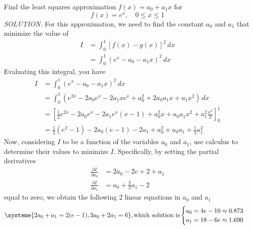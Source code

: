 \documentclass{article}
\newcommand\ddfrac[2]{\frac{\displaystyle #1}{\displaystyle #2}}
\begin{document}
    Find the least squares approximation $f(x) = a_0 + a_1x$ for
    \[f(x) = e^x, \quad 0 \le  x \le 1\]
    \textit{ \textcolor{blue5}{SOLUTION.} } For this approximation, we need to find the constant $a_0$ and $a_1$ that minimize
    the value of
    \begin{equation*}
        \begin{split}
            I &= \int_0^1 [f(x) - g(x)]^2\,dx \\
              &= \int_0^1 (e^x - a_0 - a_1x)^2\,dx
        \end{split}
    \end{equation*}
    Evaluating this integral, you have
    \begin{equation*}
        \begin{split}
            I &= \int_0^1 (e^x - a_0 - a_1x)^2\,dx\\
              &= \int_0^1 (e^{2x} - 2a_0e^x - 2a_1xe^x + a_0^2 + 2a_0a_1x + a_1x^2)\,dx\\
              &= \left[ \frac{1}{2}e^{2x} - 2a_0e^x - 2a_1e^x(x - 1) + a_0^2x + a_0a_1x^2 + a_1^2\frac{x^3}{3} \right]_0^1 \\
              &= \frac{1}{2}(e^2 - 1) - 2a_0(e - 1) - 2a_1 + a_0^2 + a_0a_1 + \frac{1}{3}a_1^2
        \end{split}
    \end{equation*}
    Now, considering $I$ to be a function of the variables $a_0$ and $a _{1}$, use calculus to determine their values to
    minimize $I$. Specifically, by setting the partial derivatives
    \begin{equation*}
        \begin{split}
            \ddfrac{\partial I}{\partial a_0} &= 2a_0 - 2e + 2 + a_1 \\
            \ddfrac{\partial I}{\partial a_1} &= a_0 + \ddfrac{2}{3}a_1 - 2
        \end{split}
    \end{equation*}
    equal to zero, we obtain the following 2 linear equations in $a_0$ and $a_1$ 
    \[\systeme {
        2a_0 + a_1 = 2(e - 1),
        3a_0 + 2a_1 = 6
    }, \text{which solution is}
    \begin{cases}{}
        a_0 = 4e - 10 \approx 0.873 \\
        a_1 = 18 - 6e \approx 1.690
    \end{cases}
    \]
\end{document}
